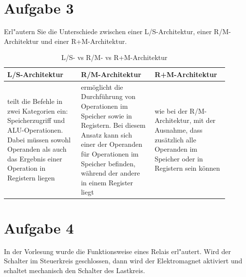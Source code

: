 \documentclass[10pt, oneside]{article}
\begin{document}
\section{Aufgabe 3}

Erl"autern Sie die Unterschiede zwischen einer L/S-Architektur, einer
R/M-Architektur und einer R+M-Architektur.

\begin{table}[h]
    \centering
    \begin{tabular}{p{0.3\linewidth}|p{0.3\linewidth}|p{0.3\linewidth}}
        L/S-Architektur & R/M-Architektur & R+M-Architektur \\
        \hline
        teilt die Befehle in zwei Kategorien ein: Speicherzugriff und
        ALU-Operationen. Dabei müssen sowohl Operanden als auch das Ergebnis
        einer Operation in Registern liegen &
        ermöglicht die Durchführung von Operationen im Speicher sowie in
        Registern. Bei diesem Ansatz kann sich einer der Operanden für
        Operationen im Speicher befinden, während der andere in einem Register
        liegt &
        wie bei der R/M-Architektur, mit der Ausnahme, dass zusätzlich alle
        Operanden im Speicher oder in Registern sein können
    \end{tabular}
    \caption{L/S- vs R/M- vs R+M-Architektur}
\end{table}

\section{Aufgabe 4}

In der Vorlesung wurde die Funktionsweise eines Relais erl"autert. Wird der
Schalter im Steuerkreis geschlossen, dann wird der Elektromagnet aktiviert und
schaltet mechanisch den Schalter des Lastkreis.
\end{document}
